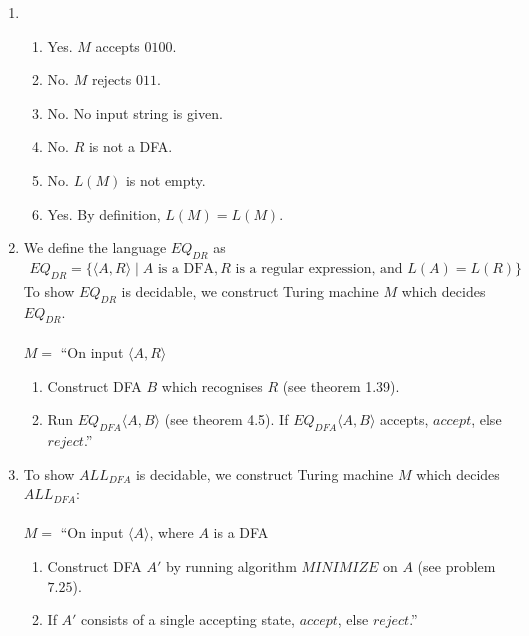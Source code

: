 \documentclass[11pt]{article}
\begin{document}
\begin{enumerate}[label=4.\arabic*]
  \item
  \begin{enumerate}
    \item Yes. $M$ accepts $0100$.
    \item No. $M$ rejects $011$.
    \item No. No input string is given.
    \item No. $R$ is not a DFA.
    \item No. $L(M)$ is not empty.
    \item Yes. By definition, $L(M) = L(M)$.
  \end{enumerate}
  \item We define the language $EQ_{DR}$ as
    \begin{align*}
      EQ_{DR} = \{ \langle A, R \rangle \mid A \text{ is a DFA}, R \text{ is a regular expression, and } L(A) = L(R) \}
    \end{align*}
    To show $EQ_{DR}$ is decidable, we construct Turing machine $M$ which decides $EQ_{DR}$. \\\\
    $M =$ ``On input $\langle A, R \rangle$
    \begin{enumerate}[label=\arabic*.]
      \item Construct DFA $B$ which recognises $R$ (see theorem 1.39).
      \item Run $EQ_{DFA}\langle A, B \rangle$ (see theorem 4.5). If $EQ_{DFA}\langle A, B \rangle$ accepts, $accept$, else $reject$.''
    \end{enumerate}
    \item To show $ALL_{DFA}$ is decidable, we construct Turing machine $M$ which decides $ALL_{DFA}$: \\\\
    $M =$ ``On input $\langle A \rangle$, where $A$ is a DFA
    \begin{enumerate}[label=\arabic*.]
      \item Construct DFA $A'$ by running algorithm $MINIMIZE$ on $A$ (see problem $7.25$).
      \item If $A'$ consists of a single accepting state, $accept$, else $reject$.''
    \end{enumerate}
\end{enumerate}
\end{document}
